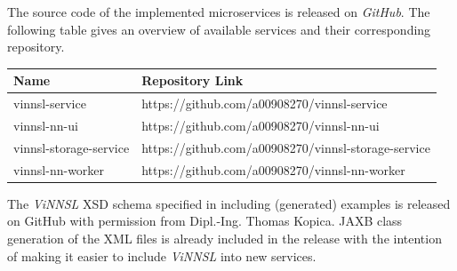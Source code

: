 The source code of the implemented microservices is released on
\emph{GitHub}. The following table gives an overview of available
services and their corresponding repository.

\begin{longtable}[]{@{}ll@{}}
\toprule
\begin{minipage}[b]{0.29\columnwidth}\raggedright\strut
Name\strut
\end{minipage} & \begin{minipage}[b]{0.65\columnwidth}\raggedright\strut
Repository Link\strut
\end{minipage}\tabularnewline
\midrule
\endhead
\begin{minipage}[t]{0.29\columnwidth}\raggedright\strut
vinnsl-service\strut
\end{minipage} & \begin{minipage}[t]{0.65\columnwidth}\raggedright\strut
https://github.com/a00908270/vinnsl-service\strut
\end{minipage}\tabularnewline
\begin{minipage}[t]{0.29\columnwidth}\raggedright\strut
vinnsl-nn-ui\strut
\end{minipage} & \begin{minipage}[t]{0.65\columnwidth}\raggedright\strut
https://github.com/a00908270/vinnsl-nn-ui\strut
\end{minipage}\tabularnewline
\begin{minipage}[t]{0.29\columnwidth}\raggedright\strut
vinnsl-storage-service\strut
\end{minipage} & \begin{minipage}[t]{0.65\columnwidth}\raggedright\strut
https://github.com/a00908270/vinnsl-storage-service\strut
\end{minipage}\tabularnewline
\begin{minipage}[t]{0.29\columnwidth}\raggedright\strut
vinnsl-nn-worker\strut
\end{minipage} & \begin{minipage}[t]{0.65\columnwidth}\raggedright\strut
https://github.com/a00908270/vinnsl-nn-worker\strut
\end{minipage}\tabularnewline
\bottomrule
\end{longtable}

The \emph{ViNNSL} XSD schema specified in \cite{kopica_2015} including
(generated) examples is released on GitHub with permission from
Dipl.-Ing. Thomas Kopica. JAXB class generation of the XML files is
already included in the release with the intention of making it easier
to include \emph{ViNNSL} into new services.

